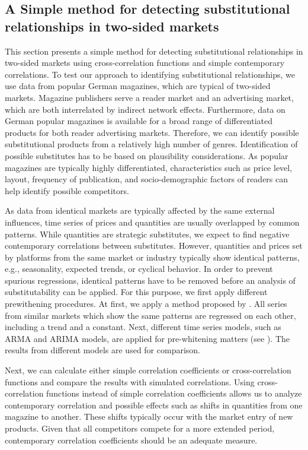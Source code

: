 \documentclass[12pt,a4paper,notitlepage]{article}
\begin{document}
\subsection{A Simple method for detecting substitutional relationships in two-sided markets}

This section presents a simple method for detecting substitutional relationships in two-sided markets using cross-correlation functions and simple contemporary correlations. To test our approach to identifying substitutional relationships, we use data from popular German magazines, which are typical of two-sided markets. Magazine publishers serve a reader market and an advertising market, which are both interrelated by indirect network effects. Furthermore, data on German popular magazines is available for a broad range of differentiated products for both reader advertising markets. Therefore, we can identify possible substitutional products from a relatively high number of genres. Identification of possible substitutes has to be based on plausibility considerations. As popular magazines are typically highly differentiated, characteristics such as price level, layout, frequency of publication, and socio-demographic factors of readers can help identify possible competitors.  

As data from identical markets are typically affected by the same external influences, time series of prices and quantities are usually overlapped by common patterns. While quantities are strategic substitutes, we expect to find negative contemporary correlations between substitutes. However, quantities and prices set by platforms from the same market or industry typically show identical patterns, e.g., seasonality, expected trends, or cyclical behavior. In order to prevent spurious regressions, identical patterns have to be removed before an analysis of substitutability can be applied. For this purpose, we first apply different prewithening procedures. At first, we apply a method proposed by \cite{dewenter_essays_2004}. All series from similar markets which show the same patterns are regressed on each other, including a trend and a constant. Next, different time series models, such as ARMA and ARIMA models, are applied for pre-whitening matters (see \cite{box_time_2008}). The results from different models are used for comparison.

Next, we can calculate either simple correlation coefficients or cross-correlation functions and compare the results with simulated correlations. Using cross-correlation functions instead of simple correlation coefficients allows us to analyze contemporary correlation and possible effects such as shifts in quantities from one magazine to another. These shifts typically occur with the market entry of new products. Given that all competitors compete for a more extended period, contemporary correlation coefficients should be an adequate measure. 
\end{document}
